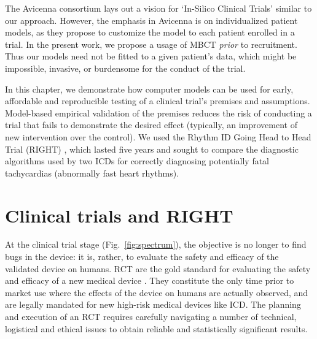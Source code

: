 The Avicenna consortium \cite{Avicenna} lays out a vision for `In-Silico Clinical Trials' similar to our approach.
However, the emphasis in Avicenna is on individualized patient models, as they propose to customize the model to each patient enrolled in a trial.
In the present work, we propose a usage of MBCT \emph{prior} to recruitment.
Thus our models need not be fitted to a given patient's data, which might be impossible, invasive, or burdensome for the conduct of the trial.

In this chapter,
we demonstrate how  computer models can be used for early, affordable and reproducible testing of a clinical trial's premises and assumptions.
Model-based empirical validation of the premises reduces the risk of conducting a trial that fails to demonstrate the desired effect (typically, an improvement of new intervention over the control). 
We used the Rhythm ID Going Head to Head Trial (RIGHT) \cite{GoldABBTB11_RIGHTresults}, which lasted five years and sought to compare the diagnostic algorithms used by two ICDs for correctly diagnosing potentially fatal tachycardias (abnormally fast heart rhythms).


\section{Clinical trials and RIGHT}
\label{sec:rcts}

At the clinical trial stage (Fig.~\ref{fig:spectrum}), the objective is no longer to find bugs in the device: it is, rather, to evaluate the safety and efficacy of the validated device on humans. 
RCT are the gold standard for evaluating the safety and efficacy of a new medical device \cite{FriedmanFD10_ClinicalTrials}.
They constitute the only time prior to market use where the effects of the device on humans are actually observed, and are legally mandated for new high-risk medical devices like ICD.
The planning and execution of an RCT requires carefully navigating a number of technical, logistical and ethical issues to obtain reliable and statistically significant results.

